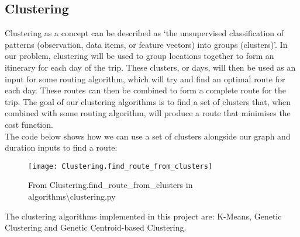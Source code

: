 
\subsection{Clustering}\label{subsec:clustering}
Clustering as a concept can be described as `the unsupervised classification of patterns (observation, data items, or
feature vectors) into groups (clusters)'.
In our problem, clustering will be used to group locations together to form an itinerary for each day of the trip.
These clusters, or days, will then be used as an input for some routing algorithm, which will try and find an
optimal route for each day.
These routes can then be combined to form a complete route for the trip.
The goal of our clustering algorithms is to find a set of clusters that, when combined with some routing algorithm,
will produce a route that minimises the cost function.\\
The code below shows how we can use a set of clusters alongside our graph and duration inputs to find a route:
\begin{figure}[H]\label{fig:Clustering.find_route_from_clusters}
    \centering
    \texttt{[image: Clustering.find\_route\_from\_clusters]}
    \caption{From Clustering.find\_route\_from\_clusters in algorithms\textbackslash clustering.py}
\end{figure}

\noindent
The clustering algorithms implemented in this project are: K-Means, Genetic Clustering and Genetic Centroid-based
Clustering.

